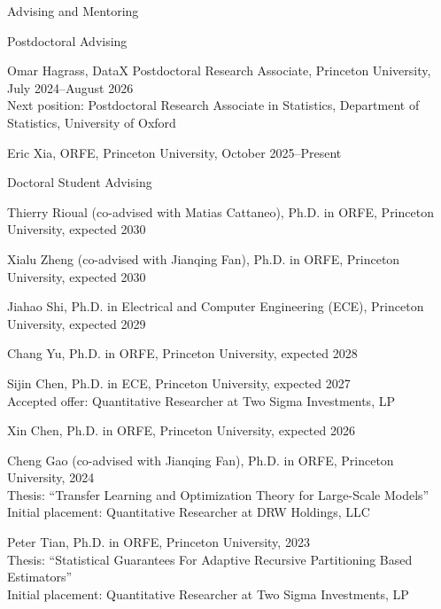 \documentclass{resume}
\begin{document}
\begin{rSection}{Advising and Mentoring}

\begin{rSubsection}{Postdoctoral Advising}{}{}{}
\item {Omar Hagrass, DataX Postdoctoral Research Associate, Princeton University, July 2024--August 2026 \\
Next position: Postdoctoral Research Associate in Statistics, Department of Statistics, University of Oxford}
\item {Eric Xia, ORFE, Princeton University, October 2025--Present}
\end{rSubsection}

\begin{rSubsection}{Doctoral Student Advising}{}{}{}
\item {Thierry Rioual (co-advised with Matias Cattaneo), Ph.D. in ORFE, Princeton University, expected 2030}
\item {Xialu Zheng (co-advised with Jianqing Fan), Ph.D. in ORFE, Princeton University, expected 2030}
\item {Jiahao Shi, Ph.D. in Electrical and Computer Engineering (ECE), Princeton University, expected 2029}
\item {Chang Yu, Ph.D. in ORFE, Princeton University, expected 2028}
\item {Sijin Chen, Ph.D. in ECE, Princeton University, expected 2027 \\
Accepted offer: Quantitative Researcher at Two Sigma Investments, LP}
\item {Xin Chen, Ph.D. in ORFE, Princeton University, expected 2026}
\item {Cheng Gao (co-advised with Jianqing Fan), Ph.D. in ORFE, Princeton University, 2024 \\
Thesis: ``Transfer Learning and Optimization Theory for Large-Scale Models'' \\
Initial placement: Quantitative Researcher at DRW Holdings, LLC}
\item {Peter Tian, Ph.D. in ORFE, Princeton University, 2023
\\
Thesis: ``Statistical Guarantees For Adaptive Recursive Partitioning Based Estimators''
\\ Initial placement: Quantitative Researcher at Two Sigma Investments, LP}
\end{rSubsection}


\end{rSection}
\end{document}

